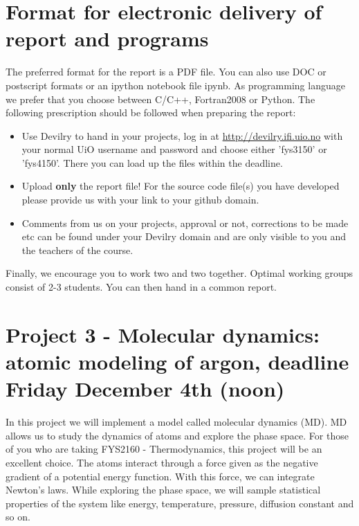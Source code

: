 \documentclass[a4wide,12pt]{article}
\begin{document}
\section*{Format for electronic delivery of report and programs}
%
The preferred format for the report is a PDF file. You can also
use DOC or postscript formats or an ipython notebook file ipynb.
As programming language we prefer that you choose between C/C++, Fortran2008 or Python.
The following prescription should be followed when preparing the report:
\begin{itemize}
\item Use Devilry to hand in your projects, log in  at 
\url{ http://devilry.ifi.uio.no} with your normal UiO username and password
and choose either 'fys3150' or 'fys4150'.
There you can load up the files within the deadline.
\item Upload {\bf only} the report file!  For the source code file(s) you have developed please provide us with your link to your github domain. 
\item Comments  from us on your projects, approval or not, corrections to be made 
etc can be found under
your Devilry domain and are only visible to you and the teachers of the course.

\end{itemize}

Finally, 
we encourage you to work two and two together. Optimal working groups consist of 
2-3 students. You can then hand in a common report. 

\section*{Project 3 - Molecular dynamics: atomic modeling of argon, deadline Friday December 4th (noon)}
In this project we will implement a model called molecular dynamics (MD). MD allows us to study the dynamics of atoms and explore the phase space. For those of you who are taking FYS2160 - Thermodynamics, this project will be an excellent choice. The atoms interact through a force given as the negative gradient of a potential energy function. With this force, we can integrate Newton's laws. While exploring the phase space, we will sample statistical properties of the system like energy, temperature, pressure, diffusion constant and so on.
\end{document}
